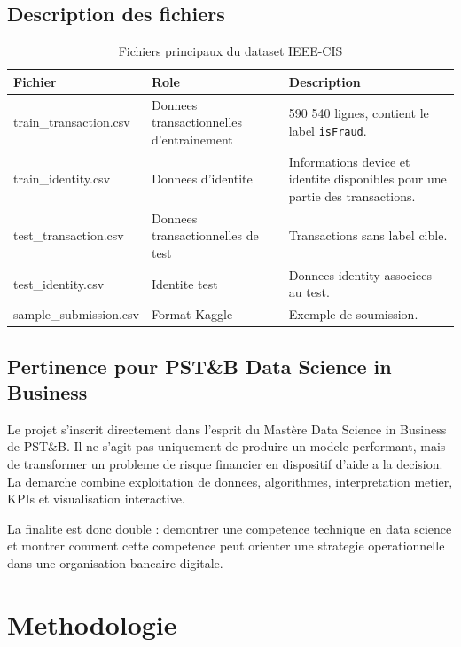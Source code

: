 ﻿\documentclass[12pt,a4paper,oneside]{report}
\begin{document}
\section{Description des fichiers}

\begin{table}[H]
\centering
\caption{Fichiers principaux du dataset IEEE-CIS}
\begin{tabular}{p{5cm}p{4cm}p{5cm}}
\toprule
\textbf{Fichier} & \textbf{Role} & \textbf{Description} \\
\midrule
train\_transaction.csv & Donnees transactionnelles d'entrainement & 590 540 lignes, contient le label \texttt{isFraud}. \\
train\_identity.csv & Donnees d'identite & Informations device et identite disponibles pour une partie des transactions. \\
test\_transaction.csv & Donnees transactionnelles de test & Transactions sans label cible. \\
test\_identity.csv & Identite test & Donnees identity associees au test. \\
sample\_submission.csv & Format Kaggle & Exemple de soumission. \\
\bottomrule
\end{tabular}
\end{table}

\section{Pertinence pour PST\&B Data Science in Business}

Le projet s'inscrit directement dans l'esprit du Mast\`ere Data Science in Business de PST\&B. Il ne s'agit pas uniquement de produire un modele performant, mais de transformer un probleme de risque financier en dispositif d'aide a la decision. La demarche combine exploitation de donnees, algorithmes, interpretation metier, KPIs et visualisation interactive.

La finalite est donc double : demontrer une competence technique en data science et montrer comment cette competence peut orienter une strategie operationnelle dans une organisation bancaire digitale.

\chapter{Methodologie}
\end{document}
